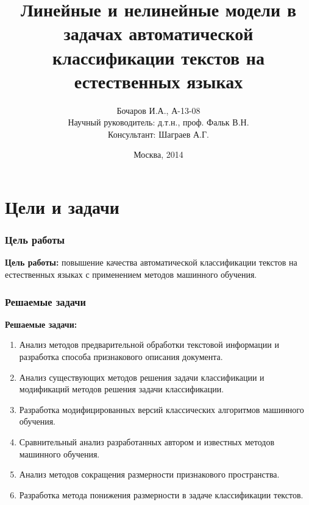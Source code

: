 \documentclass{beamer}
\begin{document}
\title[Линейные и нелинейные модели]{Линейные и нелинейные модели в задачах автоматической классификации текстов на естественных языках}  
\author[Бочаров И.А.]{Бочаров И.А., А-13-08 \\Научный руководитель: д.т.н., проф. Фальк В.Н.\\Консультант: Шаграев А.Г.}

\date{Москва, 2014} 
\begin{frame}[plain]
	\titlepage
\end{frame}
\begin{frame}
	\tableofcontents
\end{frame}

\section{Цели и задачи}
\begin{frame}
	\tableofcontents[currentsection]
\end{frame}

\begin{frame}
\frametitle{Цель работы}
\textbf{Цель работы:} повышение качества автоматической классификации текстов на естественных языках с применением методов машинного обучения.\\
\end{frame}

\begin{frame}
\frametitle{Решаемые задачи}

\textbf{Решаемые задачи:}
\begin{enumerate}
	\item{Анализ методов предварительной обработки текстовой информации и разработка способа признакового описания документа.}
	\item{Анализ существующих методов решения задачи классификации и модификаций методов решения задачи классификации.}
	\item{Разработка модифицированных версий классических алгоритмов машинного обучения.}
	\item{Сравнительный анализ разработанных автором и известных методов машинного обучения.}
	\item{Анализ методов сокращения размерности признакового пространства.}
	\item{Разработка метода понижения размерности в задаче классификации текстов.}
\end{enumerate}
\end{frame}
\end{document}
